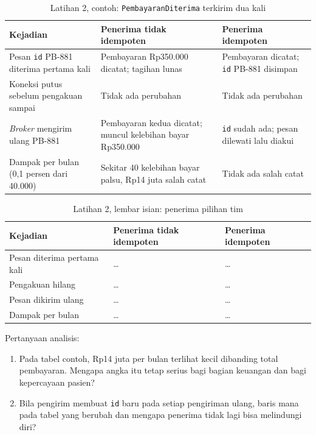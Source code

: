 \begin{table}[!htb]
  \centering
  \caption{Latihan 2, contoh: \texttt{PembayaranDiterima} terkirim dua kali}
  \label{tab:ch09-lat2-contoh}
  \footnotesize
  \begin{tabularx}{\textwidth}{>{\raggedright\arraybackslash}p{3.0cm} >{\raggedright\arraybackslash}X >{\raggedright\arraybackslash}X}
    \hline
    \textbf{Kejadian} & \textbf{Penerima tidak idempoten} & \textbf{Penerima idempoten} \\ \hline
    Pesan \texttt{id} PB-881 diterima pertama kali & Pembayaran Rp350.000 dicatat; tagihan lunas &
      Pembayaran dicatat; \texttt{id} PB-881 disimpan \\ \hline
    Koneksi putus sebelum pengakuan sampai & Tidak ada perubahan & Tidak ada perubahan \\ \hline
    \textit{Broker} mengirim ulang PB-881 & Pembayaran kedua dicatat; muncul kelebihan bayar
      Rp350.000 & \texttt{id} sudah ada; pesan dilewati lalu diakui \\ \hline
    Dampak per bulan (0,1 persen dari 40.000) & Sekitar 40 kelebihan bayar palsu, Rp14 juta salah
      catat & Tidak ada salah catat \\ \hline
  \end{tabularx}
\end{table}

\begin{table}[!htb]
  \centering
  \caption{Latihan 2, lembar isian: penerima pilihan tim}
  \label{tab:ch09-lat2-hasil}
  \footnotesize
  \begin{tabularx}{\textwidth}{>{\raggedright\arraybackslash}p{3.0cm} >{\raggedright\arraybackslash}X >{\raggedright\arraybackslash}X}
    \hline
    \textbf{Kejadian} & \textbf{Penerima tidak idempoten} & \textbf{Penerima idempoten} \\ \hline
    Pesan diterima pertama kali & \dots & \dots \\ \hline
    Pengakuan hilang & \dots & \dots \\ \hline
    Pesan dikirim ulang & \dots & \dots \\ \hline
    Dampak per bulan & \dots & \dots \\ \hline
  \end{tabularx}
\end{table}

Pertanyaan analisis:
\begin{enumerate}
  \item Pada tabel contoh, Rp14 juta per bulan terlihat kecil dibanding total pembayaran. Mengapa
        angka itu tetap serius bagi bagian keuangan dan bagi kepercayaan pasien?
  \item Bila pengirim membuat \texttt{id} baru pada setiap pengiriman ulang, baris mana pada tabel
        yang berubah dan mengapa penerima tidak lagi bisa melindungi diri?
\end{enumerate}

